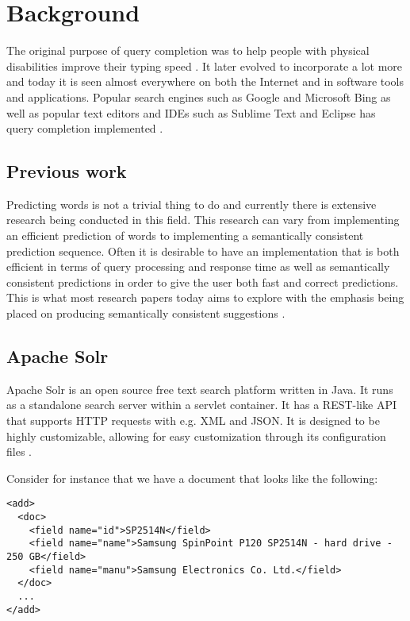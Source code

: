 \section{Background}\label{background}

The original purpose of query completion was to help people with physical disabilities improve their typing speed \cite{TAM}. It later evolved to incorporate a lot more and today it is seen almost everywhere on both the Internet and in software tools and applications. Popular search engines such as Google and Microsoft Bing \cite{GOOG, BING} as well as popular text editors and IDEs such as Sublime Text and Eclipse has query completion implemented \cite{ECLIPSE, SUBLIME}.

\subsection{Previous work}\label{previouswork}

Predicting words is not a trivial thing to do and currently there is extensive research being conducted in this field. This research can vary from implementing an efficient prediction of words to implementing a semantically consistent prediction sequence. Often it is desirable to have an implementation that is both efficient in terms of query processing and response time as well as semantically consistent predictions in order to give the user both fast and correct predictions. This is what most research papers today aims to explore with the emphasis being placed on producing semantically consistent suggestions \cite{MEI, CUCERZAN}. 

\subsection{Apache Solr}

Apache Solr is an open source free text search platform written in Java. It runs as a standalone search server within a servlet container. It has a REST-like API that supports HTTP requests with e.g. XML and JSON. It is designed to be highly customizable, allowing for easy customization through its configuration files \cite{SOLR}.

Consider for instance that we have a document that looks like the following:

\begin{verbatim}
<add>
  <doc>
    <field name="id">SP2514N</field>
    <field name="name">Samsung SpinPoint P120 SP2514N - hard drive - 250 GB</field>
    <field name="manu">Samsung Electronics Co. Ltd.</field>
  </doc>
  ...
</add>
\end{verbatim}

